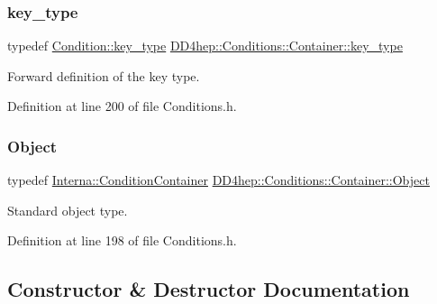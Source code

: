 \subsubsection{\texorpdfstring{key\+\_\+type}{key\_type}}
{\footnotesize\ttfamily typedef \hyperlink{class_d_d4hep_1_1_conditions_1_1_condition_a7528efa762e8cc072ef80ea67c3531f9}{Condition\+::key\+\_\+type} \hyperlink{class_d_d4hep_1_1_conditions_1_1_container_a65e62d9e4a43b9b0e9e46a7b80876a21}{D\+D4hep\+::\+Conditions\+::\+Container\+::key\+\_\+type}}



Forward definition of the key type. 



Definition at line 200 of file Conditions.\+h.

\hypertarget{class_d_d4hep_1_1_conditions_1_1_container_a45d612d4b81c549a40ca21e3318d3ddb}{}\label{class_d_d4hep_1_1_conditions_1_1_container_a45d612d4b81c549a40ca21e3318d3ddb} 
\subsubsection{\texorpdfstring{Object}{Object}}
{\footnotesize\ttfamily typedef \hyperlink{class_d_d4hep_1_1_conditions_1_1_interna_1_1_condition_container}{Interna\+::\+Condition\+Container} \hyperlink{class_d_d4hep_1_1_conditions_1_1_container_a45d612d4b81c549a40ca21e3318d3ddb}{D\+D4hep\+::\+Conditions\+::\+Container\+::\+Object}}



Standard object type. 



Definition at line 198 of file Conditions.\+h.



\subsection{Constructor \& Destructor Documentation}
\hypertarget{class_d_d4hep_1_1_conditions_1_1_container_a818694fd4f2a174649be6e820e57c6ab}{}\label{class_d_d4hep_1_1_conditions_1_1_container_a818694fd4f2a174649be6e820e57c6ab} 
